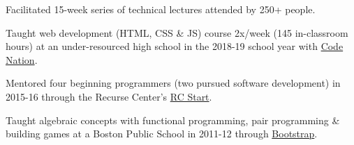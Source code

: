 \documentclass[letterpaper]{deedy-resume} %
\begin{document}
\begin{minipage}[t]{0.66\textwidth}

\begin{tightitemize}
\item Facilitated 15-week series of technical lectures attended by 250+ people.
\end{tightitemize}

\sectionspace %


%
\begin{tightitemize}
\item Taught web development (HTML, CSS \& JS) course 2x/week (145 in-classroom hours) at an under-resourced high school in the 2018-19 school year with \href{https://codenation.org/}{Code Nation}.
\item Mentored four beginning programmers (two pursued software development) in 2015-16 through the Recurse Center's \href{https://www.recurse.com/blog/99-free-one-on-one-mentorship-for-new-programmers}{RC Start}.
\item Taught algebraic concepts with functional programming, pair programming \& building games at a Boston Public School in 2011-12 through \href{http://www.bootstrapworld.org}{Bootstrap}.
\end{tightitemize}
%
\sectionspace %




\end{minipage} %
\end{document}
